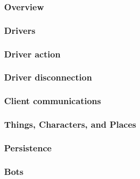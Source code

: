 \subsubsection{Overview}
\label{current:impl:overview}


\subsubsection{Drivers}
\label{sec:current:impl:drivers}


\subsubsection{Driver action}
\label{sec:current:impl:driver-action}


\subsubsection{Driver disconnection}
\label{sec:current:impl:driver-disconnection}


\subsubsection{Client communications}
\label{current:impl:clientComm}


\subsubsection{Things, Characters, and Places}
\label{sec:current:impl:objects}


\subsubsection{Persistence}
\label{sec:current:impl:persistence}


\subsubsection{Bots}\label{sec:bots-current}
\label{sec:current:impl:bots}

